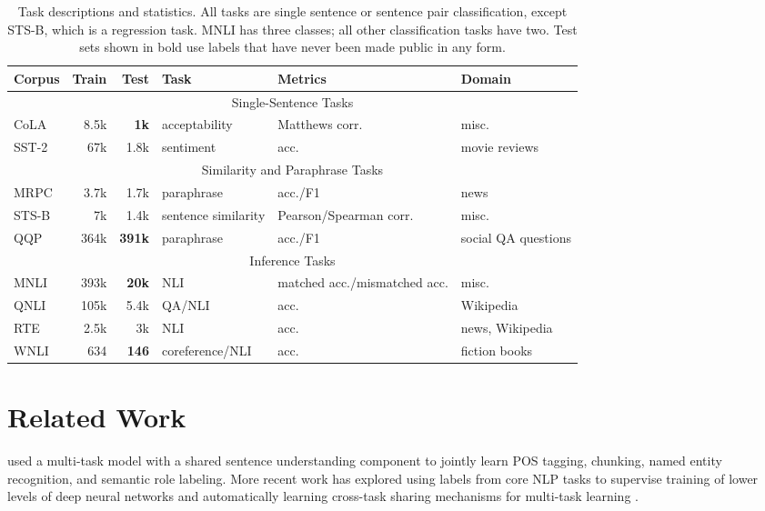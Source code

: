\documentclass{article} \usepackage{iclr2019_conference,times}
\begin{document}
\begin{table*}[t]
\centering \small
\begin{tabular}{lrrlll}
 \toprule
\textbf{Corpus} & \textbf{Train} & \textbf{Test} & \textbf{Task} & \textbf{Metrics} & \textbf{Domain} \\
\midrule
\multicolumn{6}{c}{Single-Sentence Tasks}\\
\midrule
CoLA & 8.5k & \textbf{1k} & acceptability & Matthews corr.& misc. \\ SST-2 & 67k & 1.8k & sentiment & acc. & movie reviews \\
\midrule
\multicolumn{6}{c}{Similarity and Paraphrase Tasks}\\
\midrule
MRPC & 3.7k & 1.7k & paraphrase & acc./F1 & news \\
STS-B & 7k & 1.4k & sentence similarity & Pearson/Spearman corr. & misc. \\
QQP & 364k & \textbf{391k} & paraphrase & acc./F1 & social QA questions \\
\midrule
\multicolumn{6}{c}{Inference Tasks} \\
\midrule
MNLI & 393k & \textbf{20k} & NLI & matched acc./mismatched acc. & misc. \\
QNLI & 105k & 5.4k & QA/NLI & acc. & Wikipedia \\
RTE & 2.5k & 3k & NLI & acc. & news, Wikipedia \\
WNLI & 634 & \textbf{146} & coreference/NLI & acc. & fiction books \\
\bottomrule
\end{tabular}
\caption{Task descriptions and statistics. All tasks are single sentence or sentence pair classification, except STS-B, which is a regression task. MNLI has three classes; all other classification tasks have two. Test sets shown in bold use labels that have never been made public in any form.
}
\label{tab:tasks}
\end{table*}

\section{Related Work}
\label{sec:related}
\citet{collobert2011natural} used a multi-task model with a shared sentence understanding component to jointly learn POS tagging, chunking, named entity recognition, and semantic role labeling.
More recent work has explored using labels from core NLP tasks to supervise training of lower levels of deep neural networks \citep{sogaard2016deep,hashimoto2016joint} and 
automatically learning cross-task sharing mechanisms for multi-task learning \citep{ruder2017sluice}.
\end{document}
